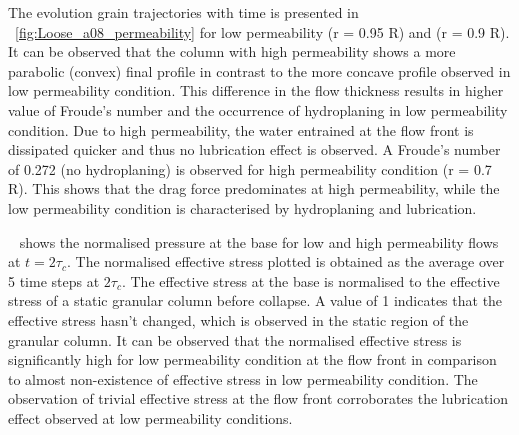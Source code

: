 The evolution grain trajectories with time is presented in 
~\cref{fig:Loose_a08_permeability} for low permeability (r = 0.95 R) and (r = 
0.9 R). It can be observed that the column with high permeability shows a more 
parabolic (convex) final profile in contrast to the more concave profile 
observed in low permeability condition. This difference in the flow thickness 
results in higher value of Froude's number and the occurrence of hydroplaning 
in low permeability condition. Due to high permeability, the water entrained at 
the flow front is dissipated quicker and thus no lubrication effect is 
observed. A Froude's number of 0.272 (no hydroplaning) is observed for high 
permeability condition (r = 0.7 R). This shows that the drag force predominates 
at high permeability, while the low permeability condition is characterised by 
hydroplaning and lubrication.

~ shows the normalised pressure at the 
base for low and high permeability flows at $ t = 2\tau_c$. The normalised 
effective stress plotted is obtained as the average over 5 time steps at 
$2\tau_c$. The effective stress at the base is normalised to the effective 
stress of a static granular column before collapse. A value of 1 indicates that 
the effective stress hasn't changed, which is observed in the static region of 
the granular column. It can be observed that the normalised effective stress is 
significantly high for low permeability condition at the flow front in 
comparison to almost non-existence of effective stress in low permeability 
condition. The observation of trivial effective stress at the flow front 
corroborates the lubrication effect observed at low permeability conditions.

